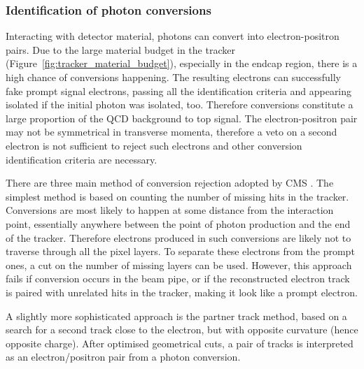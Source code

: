 \subsubsection{Identification of photon conversions}
\label{sss:photon_conversions}
Interacting with detector material, photons can convert into electron-positron pairs. Due to the large material budget
in the tracker (Figure~\ref{fig:tracker_material_budget}), especially in the endcap region, there is a high chance of
conversions happening. The resulting electrons can successfully fake prompt signal electrons, passing all the
identification criteria and appearing isolated if the initial photon was isolated, too. Therefore conversions constitute
a large proportion of the QCD background to top signal. The electron-positron pair may not be symmetrical in transverse
momenta, therefore a veto on a second electron is not sufficient to reject such electrons and other conversion
identification criteria are necessary.

There are three main method of conversion rejection adopted by CMS \autocite{electron_reconstruction_ID_7TeV}. The
simplest method is based on counting the number of missing hits in the tracker. Conversions are most likely to happen at
some distance from the interaction point, essentially anywhere between the point of photon production and the end of the
tracker. Therefore electrons produced in such conversions are likely not to traverse through all the pixel layers. To
separate these electrons from the prompt ones, a cut on the number of missing layers can be used. However, this approach
fails if conversion occurs in the beam pipe, or if the reconstructed electron track is paired with unrelated hits in the
tracker, making it look like a prompt electron.

A slightly more sophisticated approach is the partner track method, based on a search for a second track close to the
electron, but with opposite curvature (hence opposite charge). After optimised geometrical cuts, a pair of tracks is
interpreted as an electron/positron pair from a photon conversion.


